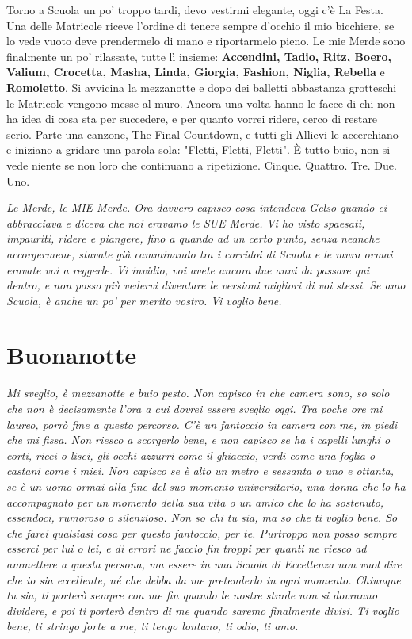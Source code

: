 Torno a Scuola un po' troppo tardi, devo vestirmi elegante, oggi c'è La Festa. Una delle Matricole riceve l'ordine di tenere sempre d'occhio il mio bicchiere, se lo vede vuoto deve prendermelo di mano e riportarmelo pieno. Le mie Merde sono finalmente un po' rilassate, tutte lì insieme: \textbf{Accendini, Tadio, Ritz, Boero, Valium, Crocetta, Masha, Linda, Giorgia, Fashion, Niglia, Rebella} e \textbf{Romoletto}. Si avvicina la mezzanotte e dopo dei balletti abbastanza grotteschi le Matricole vengono messe al muro. Ancora una volta hanno le facce di chi non ha idea di cosa sta per succedere, e per quanto vorrei ridere, cerco di restare serio. Parte una canzone, The Final Countdown, e tutti gli Allievi le accerchiano e iniziano a gridare una parola sola: "Fletti, Fletti, Fletti". È tutto buio, non si vede niente se non loro che continuano a ripetizione. Cinque. Quattro. Tre. Due. Uno.
\vspace{5mm}

\textit{Le Merde, le MIE Merde. Ora davvero capisco cosa intendeva Gelso quando ci abbracciava e diceva che noi eravamo le SUE Merde. Vi ho visto spaesati, impauriti, ridere e piangere, fino a quando ad un certo punto, senza neanche accorgermene, stavate già camminando tra i corridoi di Scuola e le mura ormai eravate voi a reggerle. Vi invidio, voi avete ancora due anni da passare qui dentro, e non posso più vedervi diventare le versioni migliori di voi stessi. Se amo Scuola, è anche un po' per merito vostro. Vi voglio bene.}

\section{Buonanotte}
\enlargethispage{4\baselineskip}
\textit{Mi sveglio, è mezzanotte e buio pesto. Non capisco in che camera sono, so solo che non è decisamente l'ora a cui dovrei essere sveglio oggi. Tra poche ore mi laureo, porrò fine a questo percorso. C'è un fantoccio in camera con me, in piedi che mi fissa. Non riesco a scorgerlo bene, e non capisco se ha i capelli lunghi o corti, ricci o lisci, gli occhi azzurri come il ghiaccio, verdi come una foglia o castani come i miei. Non capisco se è alto un metro e sessanta o uno e ottanta, se è un uomo ormai alla fine del suo momento universitario, una donna che lo ha accompagnato per un momento della sua vita o un amico che lo ha sostenuto, essendoci, rumoroso o silenzioso. Non so chi tu sia, ma so che ti voglio bene. So che farei qualsiasi cosa per questo fantoccio, per te. Purtroppo non posso sempre esserci per lui o lei, e di errori ne faccio fin troppi per quanti ne riesco ad ammettere a questa persona, ma essere in una Scuola di Eccellenza non vuol dire che io sia eccellente, né che debba da me pretenderlo in ogni momento. Chiunque tu sia, ti porterò sempre con me fin quando le nostre strade non si dovranno dividere, e poi ti porterò dentro di me quando saremo finalmente divisi. Ti voglio bene, ti stringo forte a me, ti tengo lontano, ti odio, ti amo.}

